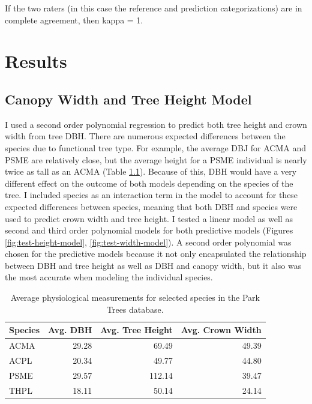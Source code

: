 \documentclass[12pt,twoside]{reedthesis}
\begin{document}
If the two raters (in this case the reference and prediction
categorizations) are in complete agreement, then kappa = 1.

\hypertarget{results}{%
\chapter{Results}\label{results}}

\hypertarget{canopy-model-results}{%
\section{Canopy Width and Tree Height Model}\label{canopy-model-results}}

I used a second order polynomial regression to predict both tree height and crown width from tree DBH. There are numerous expected differences between the species due to functional tree type. For example, the average DBJ for ACMA and PSME are relatively close, but the average height for a PSME individual is nearly twice as tall as an ACMA (Table \ref{tab:tree-stats-table}). Because of this, DBH would have a very different effect on the outcome of both models depending on the species of the tree. I included species as an interaction term in the model to account for these expected differences between species, meaning that both DBH and species were used to predict crown width and tree height. I tested a linear model as well as second and third order polynomial models for both predictive models (Figures \ref{fig:test-height-model}, \ref{fig:test-width-model}). A second order polynomial was chosen for the predictive models because it not only encapsulated the relationship between DBH and tree height as well as DBH and canopy width, but it also was the most accurate when modeling the individual species.
\begin{table}

\caption[Physiological Tree Measurements]{\label{tab:tree-stats-table}Average physiological measurements for selected species in the Park Trees database.}
\centering
\begin{tabular}[t]{lrrr}
\toprule
Species & Avg. DBH & Avg. Tree Height & Avg. Crown Width\\
\midrule
ACMA & 29.28 & 69.49 & 49.39\\
ACPL & 20.34 & 49.77 & 44.80\\
PSME & 29.57 & 112.14 & 39.47\\
THPL & 18.11 & 50.14 & 24.14\\
\bottomrule
\end{tabular}
\end{table}
\end{document}
